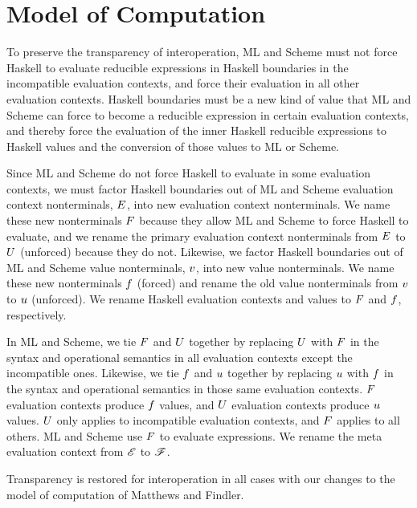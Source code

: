 \chapter{Model of Computation}

To preserve the transparency of interoperation, ML and Scheme must not force Haskell to evaluate reducible expressions in Haskell boundaries in the incompatible evaluation contexts, and force their evaluation in all other evaluation contexts. Haskell boundaries must be a new kind of value that ML and Scheme can force to become a reducible expression in certain evaluation contexts, and thereby force the evaluation of the inner Haskell reducible expressions to Haskell values and the conversion of those values to ML or Scheme.

Since ML and Scheme do not force Haskell to evaluate in some evaluation contexts, we must factor Haskell boundaries out of ML and Scheme evaluation context nonterminals, $E$, into new evaluation context nonterminals. We name these new nonterminals $F$ because they allow ML and Scheme to force Haskell to evaluate, and we rename the primary evaluation context nonterminals from $E$ to $U$ (unforced) because they do not. Likewise, we factor Haskell boundaries out of ML and Scheme value nonterminals, $v$,  into new value nonterminals. We name these new nonterminals $f$ (forced) and rename the old value nonterminals from $v$ to $u$ (unforced). We rename Haskell evaluation contexts and values to $F$ and $f$, respectively.

In ML and Scheme, we tie $F$ and $U$ together by replacing $U$ with $F$ in the syntax and operational semantics in all evaluation contexts except the incompatible ones. Likewise, we tie $f$ and $u$ together by replacing $u$ with $f$ in the syntax and operational semantics in those same evaluation contexts. $F$ evaluation contexts produce $f$ values, and $U$ evaluation contexts produce $u$ values. $U$ only applies to incompatible evaluation contexts, and $F$ applies to all others. ML and Scheme use $F$ to evaluate expressions. We rename the meta evaluation context from $\mathscr{E}$ to $\mathscr{F}$.

Transparency is restored for interoperation in all cases with our changes to the model of computation of Matthews and Findler.

